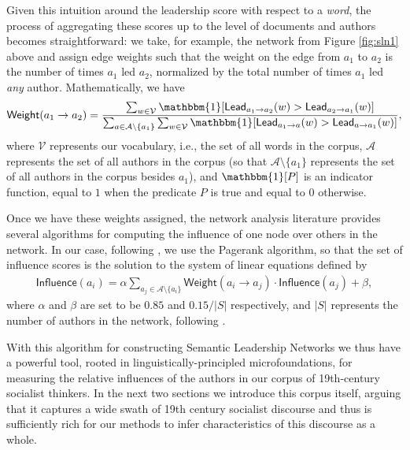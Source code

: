\documentclass[11pt]{article}
\newcommand{\Lead}[2]{\mathsf{Lead}_{#1 \rightarrow #2}}
\begin{document}
Given this intuition around the leadership score with respect to a \textit{word}, the process of aggregating these scores up to the level of documents and authors becomes straightforward: we take, for example, the network from Figure \ref{fig:sln1} above and assign edge weights such that the weight on the edge from $a_1$ to $a_2$ is the number of times $a_1$ led $a_2$, normalized by the total number of times $a_1$ led \textit{any} author. Mathematically, we have
\begin{align*}
	\mathsf{Weight}(a_1 \rightarrow a_2) = \frac{\sum_{w \in \mathcal{V}}\mathbbm{1}[\Lead{a_1}{a_2}(w) > \Lead{a_2}{a_1}(w)]}{\sum_{a \in \mathcal{A}\setminus \{a_1\}} \sum_{w \in \mathcal{V}}\mathbbm{1}[\Lead{a_1}{a}(w) > \Lead{a}{a_1}(w)]},
\end{align*}
where $\mathcal{V}$ represents our vocabulary, i.e., the set of all words in the corpus, $\mathcal{A}$ represents the set of all authors in the corpus (so that $\mathcal{A}\setminus \{a_1\}$ represents the set of all authors in the corpus besides $a_1$), and $\mathbbm{1}[P]$ is an indicator function, equal to $1$ when the predicate $P$ is true and equal to $0$ otherwise.

Once we have these weights assigned, the network analysis literature provides several algorithms for computing the influence of one node over others in the network. In our case, following \cite{soni_abolitionist_2021}, we use the Pagerank algorithm, so that the set of influence scores is the solution to the system of linear equations defined by 
\begin{align*}
	\mathsf{Influence}(a_i) = \alpha \sum_{a_j \in \mathcal{A}\setminus \{a_i\}}\mathsf{Weight}(a_i \rightarrow a_j)\cdot \mathsf{Influence}(a_j) + \beta,
\end{align*}
where $\alpha$ and $\beta$ are set to be $0.85$ and $0.15/|S|$ respectively, and $|S|$ represents the number of authors in the network, following \cite{soni_abolitionist_2021}.

With this algorithm for constructing Semantic Leadership Networks we thus have a powerful tool, rooted in linguistically-principled microfoundations, for measuring the relative influences of the authors in our corpus of 19th-century socialist thinkers. In the next two sections we introduce this corpus itself, arguing that it captures a wide swath of 19th century socialist discourse and thus is sufficiently rich for our methods to infer characteristics of this discourse as a whole. 

\end{document}
